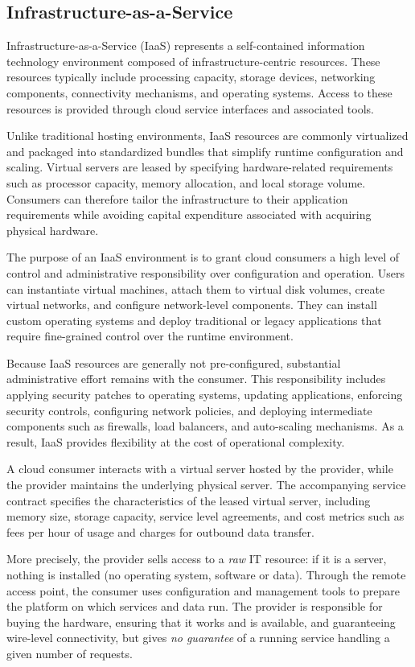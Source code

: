 \subsection{Infrastructure-as-a-Service}

Infrastructure-as-a-Service (IaaS) represents a self-contained information technology environment composed of infrastructure-centric resources. These resources typically include processing capacity, storage devices, networking components, connectivity mechanisms, and operating systems. Access to these resources is provided through cloud service interfaces and associated tools.

Unlike traditional hosting environments, IaaS resources are commonly virtualized and packaged into standardized bundles that simplify runtime configuration and scaling. Virtual servers are leased by specifying hardware-related requirements such as processor capacity, memory allocation, and local storage volume. Consumers can therefore tailor the infrastructure to their application requirements while avoiding capital expenditure associated with acquiring physical hardware.

The purpose of an IaaS environment is to grant cloud consumers a high level of control and administrative responsibility over configuration and operation. Users can instantiate virtual machines, attach them to virtual disk volumes, create virtual networks, and configure network-level components. They can install custom operating systems and deploy traditional or legacy applications that require fine-grained control over the runtime environment.

Because IaaS resources are generally not pre-configured, substantial administrative effort remains with the consumer. This responsibility includes applying security patches to operating systems, updating applications, enforcing security controls, configuring network policies, and deploying intermediate components such as firewalls, load balancers, and auto-scaling mechanisms. As a result, IaaS provides flexibility at the cost of operational complexity.

A cloud consumer interacts with a virtual server hosted by the provider, while the provider maintains the underlying physical server. The accompanying service contract specifies the characteristics of the leased virtual server, including memory size, storage capacity, service level agreements, and cost metrics such as fees per hour of usage and charges for outbound data transfer.

More precisely, the provider sells access to a \emph{raw} IT resource: if it is a server, nothing is installed (no operating system, software or data). Through the remote access point, the consumer uses configuration and management tools to prepare the platform on which services and data run. The provider is responsible for buying the hardware, ensuring that it works and is available, and guaranteeing wire-level connectivity, but gives \emph{no guarantee} of a running service handling a given number of requests.

